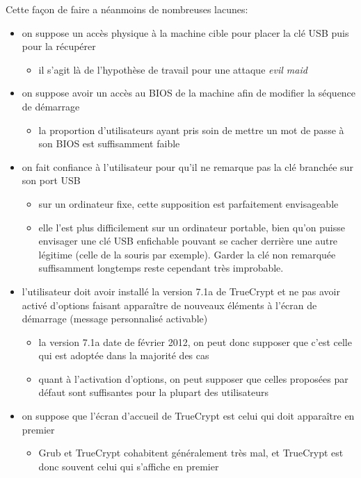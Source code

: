 \documentclass[12pt,a4paper]{article}
\begin{document}
Cette façon de faire a néanmoins de nombreuses lacunes:
{
\renewcommand{\labelitemii}{$\Rightarrow$}
\begin{itemize}
	\item on suppose un accès physique à la machine cible pour placer la clé USB puis pour la récupérer
	\begin{itemize}
		\item il s'agit là de l'hypothèse de travail pour une attaque \textit{evil maid}
	\end{itemize}
	\item on suppose avoir un accès au BIOS de la machine afin de modifier la séquence de démarrage
	\begin{itemize}
		\item la proportion d'utilisateurs ayant pris soin de mettre un mot de passe à son BIOS est suffisamment faible
	\end{itemize}
	\item on fait confiance à l'utilisateur pour qu'il ne remarque pas la clé branchée sur son port USB
	\begin{itemize}
		\item sur un ordinateur fixe, cette supposition est parfaitement envisageable
		\item elle l'est plus difficilement sur un ordinateur portable, bien qu'on puisse envisager une clé USB enfichable pouvant se cacher derrière une autre légitime (celle de la souris par exemple). Garder la clé non remarquée suffisamment longtemps reste cependant très improbable.
	\end{itemize}
	\item l'utilisateur doit avoir installé la version 7.1a de TrueCrypt et ne pas avoir activé d'options faisant apparaître de nouveaux éléments à l'écran de démarrage (message personnalisé activable)
	\begin{itemize}
		\item la version 7.1a date de février 2012, on peut donc supposer que c'est celle qui est adoptée dans la majorité des cas
		\item quant à l'activation d'options, on peut supposer que celles proposées par défaut sont suffisantes pour la plupart des utilisateurs
	\end{itemize}
	\item on suppose que l'écran d’accueil de TrueCrypt est celui qui doit apparaître en premier
	\begin{itemize}
		\item Grub et TrueCrypt cohabitent généralement très mal, et TrueCrypt est donc souvent celui qui s'affiche en premier
	\end{itemize}
\end{itemize}
}
\end{document}

